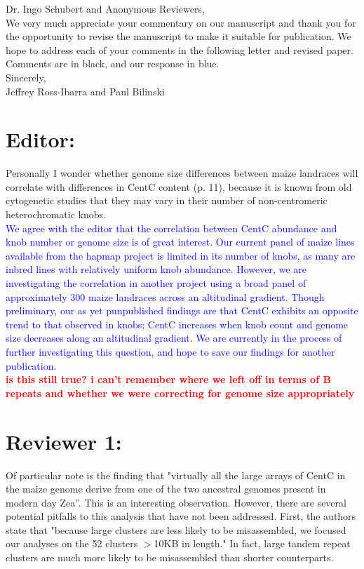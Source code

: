 \documentclass[]{article}
\newcommand{\res}[1]{\noindent \textcolor{blue}{{#1}} \\}
\newcommand{\jri}[1]{\textcolor{red}{{\bf #1}} }
\begin{document}
\noindent Dr. Ingo Schubert and Anonymous Reviewers, \\

We very much appreciate your commentary on our manuscript and thank you for the opportunity to revise the manuscript to make it suitable for publication.  
We hope to address each of your comments in the following letter and revised paper. Comments are in black, and our response in blue.\\

\noindent Sincerely,\\

\noindent Jeffrey Ross-Ibarra and Paul Bilinski

\section*{Editor:}

Personally I wonder whether genome size differences between maize landraces will correlate with differences in CentC content (p. 11), because it is known from old cytogenetic studies that they may vary in their number of non-centromeric heterochromatic knobs. \\

\res{We agree with the editor that the correlation between CentC abundance and knob number or genome size is of great interest. 
 Our current panel of maize lines available from the hapmap project is limited in its number of knobs, as many are inbred lines with relatively uniform knob abundance.  
However, we are investigating the correlation in another project using a broad panel of approximately 300 maize landraces across an altitudinal gradient.  
Though preliminary, our as yet punpublished findings are that CentC exhibits an opposite trend to that observed in knobs; CentC increases when knob count and genome size decreases along an altitudinal gradient.  
We are currently in the process of further investigating this question, and hope to save our findings for another publication.} \jri{is this still true? i can't remember where we left off in terms of B repeats and whether we were correcting for genome size appropriately}

\section*{Reviewer 1:}

Of particular note is the finding that "virtually all the large arrays of CentC in the maize genome derive from one of the two ancestral genomes present in modern day Zea”.  This is an interesting observation.  However, there are several potential pitfalls to this analysis that have not been addressed.  First, the authors state that "because large clusters are less likely to be misassembled, we focused our analyses on the 52 clusters $>$10KB in length."  In fact, large tandem repeat clusters are much more likely to be misassembled than shorter counterparts. \\
\end{document}
